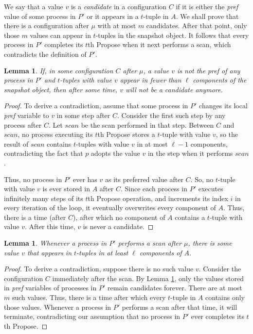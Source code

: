 \documentclass[11pt]{article}
\newtheorem{lemma}[theorem]{Lemma}
\newcounter{ind}
\begin{document}
We say that a value $v$ is a {\it candidate} in a configuration $C$ if it is either the {\it pref} value of some process in $P'$
or it appears in a $t$-tuple in $A$.
We shall prove that there is a configuration after $\mu$ with at most $m$ candidates.  
After that point, only those $m$ values can appear in $t$-tuples in the snapshot object.
It follows that every process in $P'$ completes its $t$th {\sc Propose}
when it next performs a scan, which contradicts the definition of $P'$.

\begin{lemma}
\label{disappear}
If, in some configuration $C$ after $\mu$, a value $v$ is not the 
{\it pref} of any process in $P'$ and $t$-tuples with value $v$ appear in fewer than 
$\ell$ components of the snapshot object, then after some 
time, $v$ will not be a candidate anymore.
\end{lemma}
\begin{proof}
To derive a contradiction, assume that some process in $P'$ changes its
local {\it pref} variable to $v$ in some step after $C$.
Consider the first such step by any process after $C$.
Let $scan$ be the scan performed in that step.
Between $C$ and $scan$, no process executing its $t$th {\sc Propose} stores
a $t$-tuple with value $v$, so the result of $scan$ contains $t$-tuples with value $v$
in at most $\ell-1$ components, contradicting the fact that $p$ adopts the value $v$
in the step when it performs $scan$.

Thus, no process in $P'$ ever has $v$ as its preferred value after $C$.
So, no $t$-tuple with value $v$ is ever stored in $A$ after $C$.
Since each process in $P'$ executes infinitely many steps of its $t$th
{\sc Propose} operation, and increments its index $i$ in every iteration of
the loop, it eventually overwrites every component of $A$.
Thus, there is a time (after $C$), after which no component of $A$ contains a
$t$-tuple with value $v$.
After this time, $v$ is never a candidate.
\end{proof}

\begin{lemma}
\label{choice-available}
Whenever a process in $P'$ performs a scan after $\mu$, 
there is some value $v$ that appears in $t$-tuples in at least 
$\ell$ components of $A$.
\end{lemma}
\begin{proof}
To derive a contradiction, suppose there is no such value $v$.  
Consider the configuration $C$ immediately after the scan.
By Lemma \ref{disappear}, only the values stored in {\it pref} variables of processes
in $P'$ remain candidates forever.  There are at most $m$ such values.
Thus, there is a time after which every $t$-tuple in $A$ contains only those values.
Whenever a process in $P'$ performs a scan after that time, it will
terminate, contradicting our assumption that no process in $P'$ ever completes
its $t$th {\sc Propose}.
\end{proof}
\end{document}
